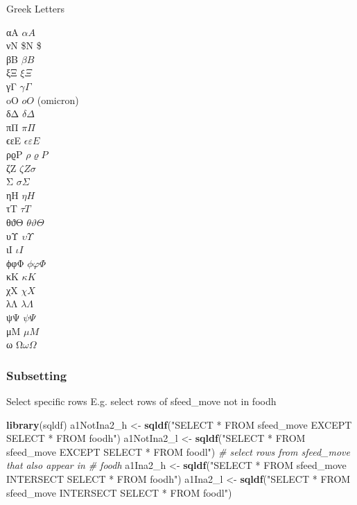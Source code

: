 \documentclass[10,portrait]{article}
\newenvironment{Shaded}{\begin{snugshade}}{\end{snugshade}}
\newcommand{\KeywordTok}[1]{\textcolor[rgb]{0.13,0.29,0.53}{\textbf{#1}}}
\newcommand{\StringTok}[1]{\textcolor[rgb]{0.31,0.60,0.02}{#1}}
\newcommand{\CommentTok}[1]{\textcolor[rgb]{0.56,0.35,0.01}{\textit{#1}}}
\newcommand{\NormalTok}[1]{#1}
\begin{document}
Greek Letters

αA \(\alpha A\)\\
νN \$\nu N \$\\
βB \(\beta B\)\\
ξΞ \(\xi\Xi\)\\
γΓ \(\gamma \Gamma\)\\
oO \(o O\) (omicron)\\
δΔ \(\delta \Delta\)\\
πΠ \(\pi \Pi\)\\
ϵεE \(\epsilon \varepsilon E\)\\
ρϱP \(\rho\varrho P\)\\
ζZ \(\zeta Z \sigma \,\!\)\\
Σ \(\sigma \Sigma\)\\
ηH \(\eta H\)\\
τT \(\tau T\)\\
θϑΘ \(\theta \vartheta \Theta\)\\
υΥ \(\upsilon \Upsilon\)\\
ιI \(\iota I\)\\
ϕφΦ \(\phi \varphi \Phi\)\\
κK \(\kappa K\)\\
χX \(\chi X\)\\
λΛ \(\lambda \Lambda\)\\
ψΨ \(\psi \Psi\)\\
μM \(\mu M\)\\
ω Ω\(\omega \Omega\)

\subsubsection{Subsetting}\label{subsetting}

Select specific rows E.g. select rows of sfeed\_move not in foodh

\begin{Shaded}
\begin{Highlighting}[]
\KeywordTok{library}\NormalTok{(sqldf)}
\NormalTok{a1NotIna2_h <-}\StringTok{ }\KeywordTok{sqldf}\NormalTok{(}\StringTok{"SELECT * FROM sfeed_move EXCEPT SELECT * FROM foodh"}\NormalTok{)}
\NormalTok{a1NotIna2_l <-}\StringTok{ }\KeywordTok{sqldf}\NormalTok{(}\StringTok{"SELECT * FROM sfeed_move EXCEPT SELECT * FROM foodl"}\NormalTok{)}
\CommentTok{# select rows from sfeed_move that also appear in}
\CommentTok{# foodh}
\NormalTok{a1Ina2_h <-}\StringTok{ }\KeywordTok{sqldf}\NormalTok{(}\StringTok{"SELECT * FROM sfeed_move INTERSECT SELECT * FROM foodh"}\NormalTok{)}
\NormalTok{a1Ina2_l <-}\StringTok{ }\KeywordTok{sqldf}\NormalTok{(}\StringTok{"SELECT * FROM sfeed_move INTERSECT SELECT * FROM foodl"}\NormalTok{)}
\end{Highlighting}
\end{Shaded}
\end{document}

